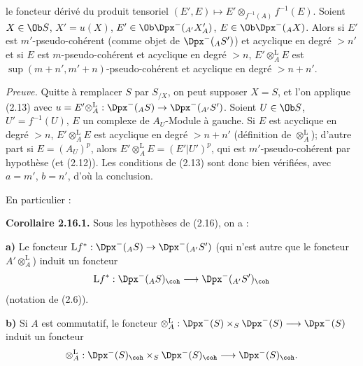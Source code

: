 le
foncteur dérivé du produit tensoriel \((E',E)\longmapsto E'\otimes_{f^{-1}(A)} f^{-1}(E)\). Soient \(X\in\Ob S\), \(X'=u(X)\), \(E'\in\Ob\Dpx^-(_{A'}X'_A)\), \(E\in\Ob\Dpx^-(_A X)\). Alors si \(E'\) est \(m'\)-pseudo-cohérent (comme objet de \(\Dpx^-(_A S')\)) et acyclique en degré \(>n'\) et si \(E\) est \(m\)-pseudo-cohérent et acyclique en degré \(>n\), \(E'\otimes_A^{\mathrm L}E\) est \(\sup(m+n',m'+n)\)-pseudo-cohérent et acyclique en degré \(>n+n'\).

\emph{Preuve.} Quitte à remplacer \(S\) par \(S_{/X}\), on peut supposer \(X=S\), et l'on applique (2.13) avec \(u=E'\otimes_A^{\mathrm L}:\Dpx^-(_A S)\to\Dpx^-(_{A'}S')\). Soient \(U\in\Ob S\), \(U'=f^{-1}(U)\), \(E\) un complexe de \(A_U\)-Module à gauche. Si \(E\) est acyclique en degré \(>n\), \(E'\otimes_A^{\mathrm L}E\) est acyclique en degré \(>n+n'\) (définition de \(\otimes_A^{\mathrm L}\)); d'autre part si \(E=(A_U)^p\), alors \(E'\otimes_A^{\mathrm L}E=(E'|U')^p\), qui est \(m'\)-pseudo-cohérent par hypothèse (et (2.12)). Les conditions de (2.13) sont donc bien vérifiées, avec \(a=m'\), \(b=n'\), d'où la conclusion.

En particulier :

\textbf{Corollaire 2.16.1.} Sous les hypothèses de (2.16), on a :

\textbf{a)} Le foncteur \(\mathrm Lf^*: \Dpx^-(_A S)\to \Dpx^-(_{A'}S')\) (qui n'est autre que le foncteur \(A'\otimes_A^{\mathrm L}\)) induit un foncteur
\[
  \mathrm Lf^*: \Dpx^-(_A S)_{\coh}\longrightarrow \Dpx^-(_{A'}S')_{\coh}
\]
(notation de (2.6)).

\textbf{b)} Si \(A\) est commutatif, le foncteur \(\otimes_A^{\mathrm L}:\Dpx^-(S)\times_S\Dpx^-(S)\longrightarrow \Dpx^-(S)\) induit un foncteur
\[
  \otimes_A^{\mathrm L}:\Dpx^-(S)_{\coh}\times_S\Dpx^-(S)_{\coh}
  \longrightarrow \Dpx^-(S)_{\coh} .
\]

